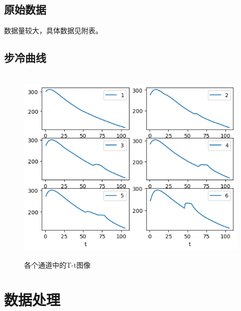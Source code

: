 \documentclass[12pt,hyperref,a4paper,UTF8]{ctexart}
\begin{document}
\subsection{原始数据}
数据量较大，具体数据见附表。

\subsection{步冷曲线}
\begin{figure}[H]
    \
    \centering
    \includegraphics[width=0.8\linewidth]{f1.png}
    \caption{各个通道中的T-t图像}
    \label{fig:enter-label6}
\end{figure}



\section{数据处理}
\end{document}
